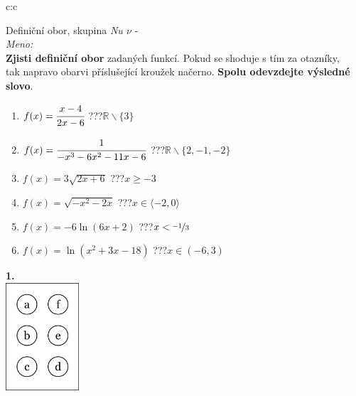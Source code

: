 \documentclass[10pt]{report}
\begin{document}
\begin{tabular}{c:c}
\begin{minipage}[c][99mm][t]{0.49\linewidth}
\begin{center}
\vspace{7mm}
{\huge Definiční obor, skupina \textit{Nu $\nu$} -}\\[4.5mm]
\textit{Meno:}\phantom{xxxxxxxxxxxxxxxxxxxxxxxxxxxxxxxxxxxxxxxxxxxxxxxxxxxxxxxxxxxxxxxxx}\\[3.5mm]
\textbf{Zjisti definiční obor} zadaných funkcí. Pokud se shoduje s tím za otazníky,\\tak napravo obarvi příslušející kroužek načerno. \textbf{Spolu odevzdejte výsledné slovo}.\\[3mm]
\begin{minipage}{0.77\linewidth}
\begin{center}
\begin{varwidth}{\textwidth}
\begin{enumerate}
\normalsize
\item $f(x)=\cfrac{x-4}{2x-6}$\quad \dotfill\; ???\;\dotfill \quad $\mathbb{R}\smallsetminus\{3\}$
\item $f(x)=\cfrac{1}{-x^3-6x^2-11x-6}$\quad \dotfill\; ???\;\dotfill \quad $\mathbb{R}\smallsetminus\{2,-1,-2\}$
\item $f(x)=3\sqrt{2x+6}$\quad \dotfill\; ???\;\dotfill \quad $x\geq-3$
\item $f(x)=\sqrt{-x^2-2x}$\quad \dotfill\; ???\;\dotfill \quad $x\in\langle-2 , 0\rangle$
\item $f(x)=-6\ln{(6x+2)}$\quad \dotfill\; ???\;\dotfill \quad $x<\nicefrac{-1}{3}$
\item $f(x)=\ln{(x^2+3x-18)}$\quad \dotfill\; ???\;\dotfill \quad $x\in(-6 , 3)$
\end{enumerate}
\end{varwidth}
\end{center}
\end{minipage}
\begin{minipage}{0.20\linewidth}
\begin{center}
{\Huge\bfseries 1.} \\[2mm]
\includegraphics[height=40mm]{../images/braille.png}

\end{center}
\end{minipage}
\end{center}
\end{minipage}
\end{tabular}
\end{document}
